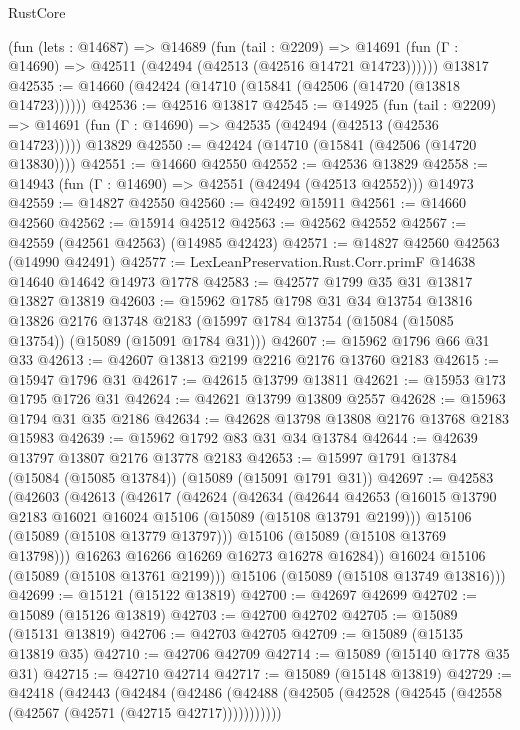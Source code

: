 \begin{lexlean}{RustCore}
\begin{coremodule}
    (fun (lets : @14687) =>
    @14689
      (fun (tail : @2209) =>
      @14691 (fun (Γ : @14690) => @42511 (@42494 (@42513 (@42516 @14721 @14723))))))
    @13817
@42535 := @14660 (@42424 (@14710 (@15841 (@42506 (@14720 (@13818 @14723))))))
@42536 := @42516 @13817
@42545 := @14925
    (fun (tail : @2209) => @14691 (fun (Γ : @14690) => @42535 (@42494 (@42513 (@42536 @14723)))))
    @13829
@42550 := @42424 (@14710 (@15841 (@42506 (@14720 @13830))))
@42551 := @14660 @42550
@42552 := @42536 @13829
@42558 := @14943 (fun (Γ : @14690) => @42551 (@42494 (@42513 @42552))) @14973
@42559 := @14827 @42550
@42560 := @42492 @15911
@42561 := @14660 @42560
@42562 := @15914 @42512
@42563 := @42562 @42552
@42567 := @42559 (@42561 @42563) (@14985 @42423)
@42571 := @14827 @42560 @42563 (@14990 @42491)
@42577 := LexLeanPreservation.Rust.Corr.primF @14638 @14640 @14642 @14973 @1778
@42583 := @42577 @1799 @35 @31 @13817 @13827 @13819
@42603 := @15962
    @1785
    @1798
    @31
    @34
    @13754
    @13816
    @13826
    @2176
    @13748
    @2183
    (@15997 @1784 @13754 (@15084 (@15085 @13754)) (@15089 (@15091 @1784 @31)))
@42607 := @15962 @1796 @66 @31 @33
@42613 := @42607 @13813 @2199 @2216 @2176 @13760 @2183
@42615 := @15947 @1796 @31
@42617 := @42615 @13799 @13811
@42621 := @15953 @173 @1795 @1726 @31
@42624 := @42621 @13799 @13809 @2557
@42628 := @15963 @1794 @31 @35 @2186
@42634 := @42628 @13798 @13808 @2176 @13768 @2183 @15983
@42639 := @15962 @1792 @83 @31 @34 @13784
@42644 := @42639 @13797 @13807 @2176 @13778 @2183
@42653 := @15997 @1791 @13784 (@15084 (@15085 @13784)) (@15089 (@15091 @1791 @31))
@42697 := @42583
    (@42603
      (@42613
        (@42617
          (@42624
            (@42634
              (@42644
                @42653
                (@16015 @13790 @2183 @16021 @16024 @15106 (@15089 (@15108 @13791 @2199)))
                @15106
                (@15089 (@15108 @13779 @13797)))
              @15106
              (@15089 (@15108 @13769 @13798)))
            @16263
            @16266
            @16269
            @16273
            @16278
            @16284))
        @16024
        @15106
        (@15089 (@15108 @13761 @2199)))
      @15106
      (@15089 (@15108 @13749 @13816)))
@42699 := @15121 (@15122 @13819)
@42700 := @42697 @42699
@42702 := @15089 (@15126 @13819)
@42703 := @42700 @42702
@42705 := @15089 (@15131 @13819)
@42706 := @42703 @42705
@42709 := @15089 (@15135 @13819 @35)
@42710 := @42706 @42709
@42714 := @15089 (@15140 @1778 @35 @31)
@42715 := @42710 @42714
@42717 := @15089 (@15148 @13819)
@42729 := @42418
    (@42443
      (@42484
        (@42486 (@42488 (@42505 (@42528 (@42545 (@42558 (@42567 (@42571 (@42715 @42717)))))))))))

\end{coremodule}
\end{lexlean}

